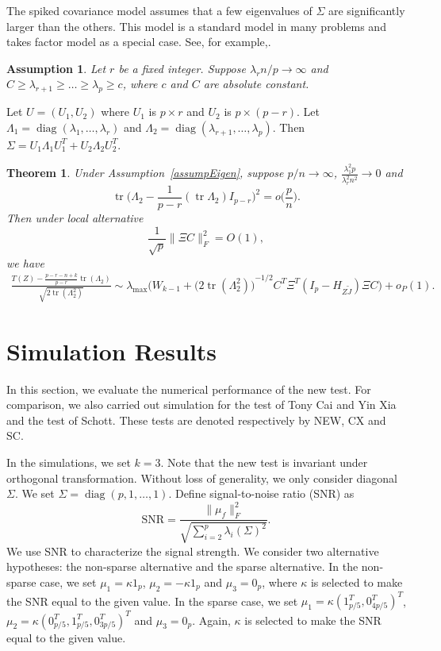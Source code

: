 \documentclass[review]{elsarticle}
\DeclareMathOperator{\mytr}{tr}
\DeclareMathOperator{\mydiag}{diag}
\theoremstyle{plain}
\newtheorem{theorem}{\quad\quad Theorem}
\newtheorem{assumption}{\quad\quad Assumption}
\theoremstyle{definition}
\theoremstyle{remark}
\begin{document}
The spiked covariance model assumes that a few eigenvalues of $\Sigma$ are significantly larger than the others. This model is a standard model in many problems and takes factor model as a special case.
See, for example,.

\begin{assumption}\label{assumpEigen}
    Let $r$ be a fixed integer.
    Suppose ${\lambda_r n}/{p}\to \infty$ and $C \geq \lambda_{r+1} \geq \ldots \geq \lambda_{p} \geq c$, where $c$ and $C$ are absolute constant.
\end{assumption}
Let $U=(U_1,U_2)$ where $U_1$ is $p\times r$ and $U_2$ is $p\times (p-r)$. Let $\Lambda_1=\mydiag(\lambda_1,\ldots,\lambda_r)$ and $\Lambda_2=\mydiag(\lambda_{r+1},\ldots,\lambda_p)$.
Then $\Sigma=U_1\Lambda_1 U_1^T+U_2\Lambda_2 U_2^T$.


\begin{theorem}\label{thm1}
    Under Assumption~\eqref{assumpEigen}, suppose $p/n\to \infty$,
    $\frac{\lambda_1^2 p}{\lambda_r^2 n^2}\to 0$ and
    $$
    \mytr\Big(\Lambda_2-\frac{1}{p-r}(\mytr \Lambda_2)I_{p-r}\Big)^2=o\big(\frac{p}{n}\big).
    $$
    Then under local alternative
    \begin{equation*}
        \frac{1}{\sqrt{p}}\|\Xi C\|_F^2=O(1),
    \end{equation*}
    we have
    $$
    \begin{aligned}
        \frac{T(Z)-\frac{p-r-n+k}{p-r}\mytr(\Lambda_2)}{\sqrt{2\mytr (\Lambda_2^2)}}
        \sim
        \lambda_{\max}\Big(W_{k-1}+{\big(2\mytr (\Lambda_2^2)\big)}^{-1/2} C^T \Xi^T (I_p-H_{Z\tilde{J}})\Xi C\Big)
        +o_P(1).
    \end{aligned}
    $$
\end{theorem}




\section{Simulation Results}

In this section, we evaluate the numerical performance of the new test. For comparison, we also carried out simulation for the test of Tony Cai and Yin Xia and the test of Schott. These tests are denoted respectively by NEW, CX and SC.

In the simulations, we set $k=3$.
Note that the new test is invariant under orthogonal transformation.
Without loss of generality, we only consider diagonal $\Sigma$.
We set $\Sigma=\mydiag(p,1,\ldots,1)$.
Define signal-to-noise ratio (SNR) as
$$
\textrm{SNR}=\frac{\|\mu_f\|_F^2}{\sqrt{\sum_{i=2}^{p}\lambda_i(\Sigma)^2}}.
$$
We use SNR to characterize the signal strength.
We consider two alternative hypotheses: the non-sparse alternative and the sparse alternative.
In the non-sparse case, we set $\mu_1=\kappa 1_p$, $\mu_2=-\kappa 1_p$ and $\mu_3=0_p$, where $\kappa$ is selected to make the SNR equal to the given value.
In the sparse case, we set $\mu_1=\kappa (1_{p/5}^T,0_{4p/5}^T)^T$, $\mu_2=\kappa (0_{p/5}^T, 1_{p/5}^T,0_{3p/5}^T)^T$ and $\mu_3=0_p$. Again, $\kappa$ is selected to make the SNR equal to the given value.
\end{document}
